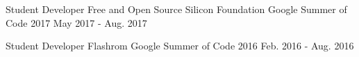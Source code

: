 
\begin{cventries}

\cventry
	{Student Developer} %
	{Free and Open Source Silicon Foundation} %
	{Google Summer of Code 2017} %
	{May 2017 - Aug. 2017} %
	{\begin{cvitems} %
		\item {}
	\end{cvitems}}

\cventry
	{Student Developer} %
	{Flashrom} %
	{Google Summer of Code 2016} %
	{Feb. 2016 - Aug. 2016} %
	{\begin{cvitems} %
		\item {}
	\end{cvitems}}

\end{cventries}
